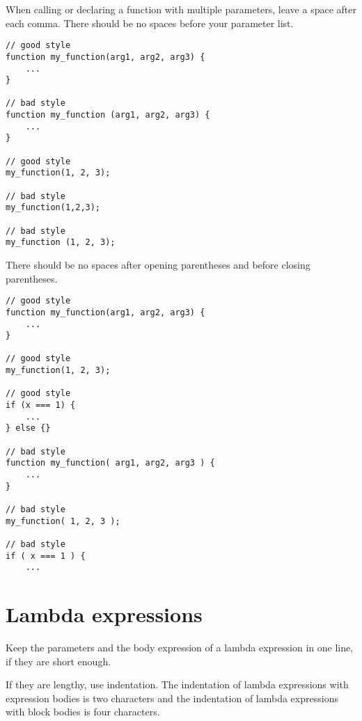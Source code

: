 When calling or declaring a function with multiple parameters, leave a space after each comma.
There should be no spaces before your parameter list.

\begin{lstlisting}
// good style
function my_function(arg1, arg2, arg3) {
    ...
}

// bad style
function my_function (arg1, arg2, arg3) {
    ...
}

// good style
my_function(1, 2, 3);

// bad style
my_function(1,2,3);

// bad style
my_function (1, 2, 3);
\end{lstlisting}

There should be no spaces after opening parentheses and before closing parentheses.
  
\begin{lstlisting}
// good style
function my_function(arg1, arg2, arg3) {
    ...
}

// good style
my_function(1, 2, 3);

// good style
if (x === 1) {
    ...
} else {}

// bad style
function my_function( arg1, arg2, arg3 ) {
    ...
}

// bad style
my_function( 1, 2, 3 );

// bad style
if ( x === 1 ) {
    ...
\end{lstlisting}

\vspace{-4mm}

\section*{Lambda expressions}

Keep the parameters and the body expression of a lambda expression
in one line, if they are short enough.

If they are lengthy, use
indentation. The indentation of lambda expressions with expression bodies is
two characters and the indentation of lambda expressions with block bodies is
four characters.

